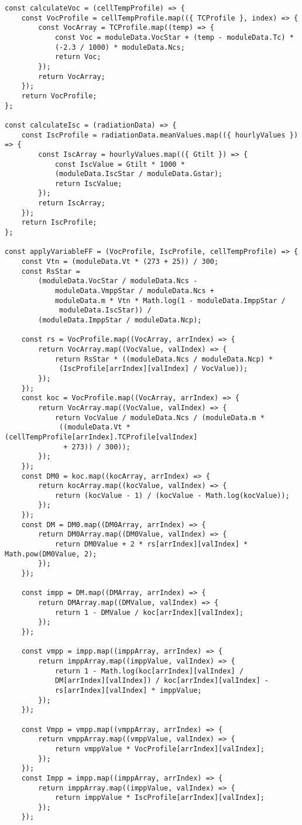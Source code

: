 \begin{lstlisting}[style=ES6, caption={public/scripts/DataAquisition.js}]
const calculateVoc = (cellTempProfile) => {
	const VocProfile = cellTempProfile.map(({ TCProfile }, index) => {
		const VocArray = TCProfile.map((temp) => {
			const Voc = moduleData.VocStar + (temp - moduleData.Tc) * 
			(-2.3 / 1000) * moduleData.Ncs;
			return Voc;
		});
		return VocArray;
	});
	return VocProfile;
};

const calculateIsc = (radiationData) => {
	const IscProfile = radiationData.meanValues.map(({ hourlyValues }) => {
		const IscArray = hourlyValues.map(({ Gtilt }) => {
			const IscValue = Gtilt * 1000 * 
			(moduleData.IscStar / moduleData.Gstar);
			return IscValue;
		});
		return IscArray;
	});
	return IscProfile;
};

const applyVariableFF = (VocProfile, IscProfile, cellTempProfile) => {
	const Vtn = (moduleData.Vt * (273 + 25)) / 300;
	const RsStar =
		(moduleData.VocStar / moduleData.Ncs -
			moduleData.VmppStar / moduleData.Ncs +
			moduleData.m * Vtn * Math.log(1 - moduleData.ImppStar /
			 moduleData.IscStar)) /
		(moduleData.ImppStar / moduleData.Ncp);

	const rs = VocProfile.map((VocArray, arrIndex) => {
		return VocArray.map((VocValue, valIndex) => {
			return RsStar * ((moduleData.Ncs / moduleData.Ncp) *
			 (IscProfile[arrIndex][valIndex] / VocValue));
		});
	});
	const koc = VocProfile.map((VocArray, arrIndex) => {
		return VocArray.map((VocValue, valIndex) => {
			return VocValue / moduleData.Ncs / (moduleData.m *
			 ((moduleData.Vt * (cellTempProfile[arrIndex].TCProfile[valIndex]
			  + 273)) / 300));
		});
	});
	const DM0 = koc.map((kocArray, arrIndex) => {
		return kocArray.map((kocValue, valIndex) => {
			return (kocValue - 1) / (kocValue - Math.log(kocValue));
		});
	});
	const DM = DM0.map((DM0Array, arrIndex) => {
		return DM0Array.map((DM0Value, valIndex) => {
			return DM0Value + 2 * rs[arrIndex][valIndex] * Math.pow(DM0Value, 2);
		});
	});

	const impp = DM.map((DMArray, arrIndex) => {
		return DMArray.map((DMValue, valIndex) => {
			return 1 - DMValue / koc[arrIndex][valIndex];
		});
	});

	const vmpp = impp.map((imppArray, arrIndex) => {
		return imppArray.map((imppValue, valIndex) => {
			return 1 - Math.log(koc[arrIndex][valIndex] / 
			DM[arrIndex][valIndex]) / koc[arrIndex][valIndex] - 
			rs[arrIndex][valIndex] * imppValue;
		});
	});

	const Vmpp = vmpp.map((vmppArray, arrIndex) => {
		return vmppArray.map((vmppValue, valIndex) => {
			return vmppValue * VocProfile[arrIndex][valIndex];
		});
	});
	const Impp = impp.map((imppArray, arrIndex) => {
		return imppArray.map((imppValue, valIndex) => {
			return imppValue * IscProfile[arrIndex][valIndex];
		});
	});


\end{lstlisting}
